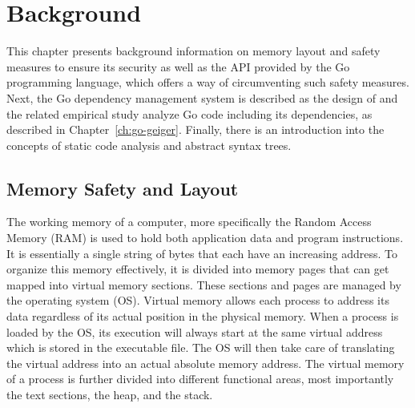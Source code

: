 
\chapter{Background}\label{ch:background}

This chapter presents background information on memory layout and safety measures to ensure its security as well as the
\unsafe{} \acrshort{API} provided by the Go programming language, which offers a way of circumventing such safety
measures.
Next, the Go dependency management system is described as the design of \toolGeiger{} and the related empirical study
analyze Go code including its dependencies, as described in Chapter~\ref{ch:go-geiger}.
Finally, there is an introduction into the concepts of static code analysis and abstract syntax trees.



\section{Memory Safety and Layout}\label{sec:background:memory-safety-layout}

The working memory of a computer, more specifically the Random Access Memory (\acrshort{RAM}) is used to hold both
application data and program instructions.
It is essentially a single string of bytes that each have an increasing address.
To organize this memory effectively, it is divided into memory pages that can get mapped into virtual memory sections.
These sections and pages are managed by the operating system (\acrshort{OS}).
Virtual memory allows each process to address its data regardless of its actual position in the physical memory.
When a process is loaded by the \acrshort{OS}, its execution will always start at the same virtual address which is
stored in the executable file.
The \acrshort{OS} will then take care of translating the virtual address into an actual absolute memory address.
The virtual memory of a process is further divided into different functional areas, most importantly the text sections,
the heap, and the stack.

